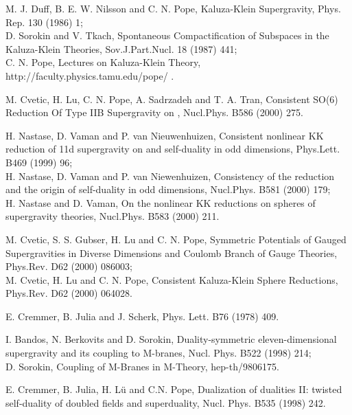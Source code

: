\documentclass[a4paper,11pt]{article}
\begin{document}
\begin{thebibliography}{99}
M. J. Duff, B. E. W. Nilsson and C. N. Pope, Kaluza-Klein
Supergravity, Phys. Rep. 130 (1986) 1;\\
D. Sorokin and V. Tkach, Spontaneous Compactification of Subspaces
in the Kaluza-Klein Theories, Sov.J.Part.Nucl. 18 (1987) 441;\\
C. N. Pope, Lectures on Kaluza-Klein Theory,
http://faculty.physics.tamu.edu/pope/ .



M. Cvetic, H. Lu, C. N. Pope, A. Sadrzadeh and T. A. Tran,
Consistent SO(6) Reduction Of Type IIB Supergravity on \coordHE{},
Nucl.Phys. B586 (2000) 275.









H. Nastase, D. Vaman and P. van Nieuwenhuizen, Consistent
nonlinear KK reduction of 11d supergravity on \coordHE{}
and self-duality in odd dimensions, Phys.Lett. B469 (1999) 96;\\
H. Nastase, D. Vaman and P. van Niewenhuizen, Consistency of the
\coordHE{} reduction and the origin of self-duality in odd
dimensions, Nucl.Phys. B581 (2000) 179; \\H. Nastase and D. Vaman,
On the nonlinear KK reductions on spheres of supergravity
theories, Nucl.Phys. B583 (2000) 211.

M. Cvetic, S. S. Gubser, H. Lu and C. N. Pope,
Symmetric Potentials of Gauged Supergravities in Diverse Dimensions and
Coulomb Branch of Gauge Theories, Phys.Rev. D62 (2000) 086003;\\
M. Cvetic, H. Lu and C. N. Pope, Consistent Kaluza-Klein Sphere
Reductions, Phys.Rev. D62 (2000) 064028.



E. Cremmer, B. Julia and J. Scherk, Phys. Lett. B76 (1978) 409.


I. Bandos, N. Berkovits and D. Sorokin, Duality-symmetric
eleven-dimensional supergravity and its coupling to M-branes,
Nucl. Phys.  B522 (1998) 214;\\
D. Sorokin, Coupling of M-Branes in M-Theory, hep-th/9806175.

E. Cremmer, B. Julia, H. L\"u and C.N. Pope, Dualization of dualities II:
twisted self-duality of doubled fields and superduality, Nucl. Phys. B535
(1998) 242.



\end{thebibliography}
\end{document}
